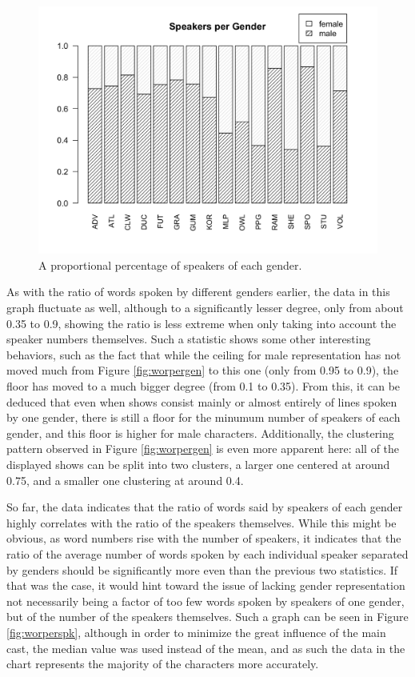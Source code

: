 \documentclass[a4paper, 11pt]{article}
\begin{document}
\begin{figure}[t!]
  \includegraphics[width=\linewidth]{figures/spkpergen.png}
  \caption{A proportional percentage of speakers of each gender.}
  \label{fig:spkpergen}
\end{figure}

As with the ratio of words spoken by different genders earlier, the data in this graph fluctuate as well, although to a significantly lesser degree, only from about 0.35 to 0.9, showing the ratio is less extreme when only taking into account the speaker numbers themselves. Such a statistic shows some other interesting behaviors, such as the fact that while the ceiling for male representation has not moved much from Figure \ref{fig:worpergen} to this one (only from 0.95 to 0.9), the floor has moved to a much bigger degree (from 0.1 to 0.35). From this, it can be deduced that even when shows consist mainly or almost entirely of lines spoken by one gender, there is still a floor for the minumum number of speakers of each gender, and this floor is higher for male characters. Additionally, the clustering pattern observed in Figure \ref{fig:worpergen} is even more apparent here: all of the displayed shows can be split into two clusters, a larger one centered at around 0.75, and a smaller one clustering at around 0.4.

So far, the data indicates that the ratio of words said by speakers of each gender highly correlates with the ratio of the speakers themselves. While this might be obvious, as word numbers rise with the number of speakers, it indicates that the ratio of the average number of words spoken by each individual speaker separated by genders should be significantly more even than the previous two statistics. If that was the case, it would hint toward the issue of lacking gender representation not necessarily being a factor of too few words spoken by speakers of one gender, but of the number of the speakers themselves. Such a graph can be seen in Figure \ref{fig:worperspk}, although in order to minimize the great influence of the main cast, the median value was used instead of the mean, and as such the data in the chart represents the majority of the characters more accurately.
\end{document}
